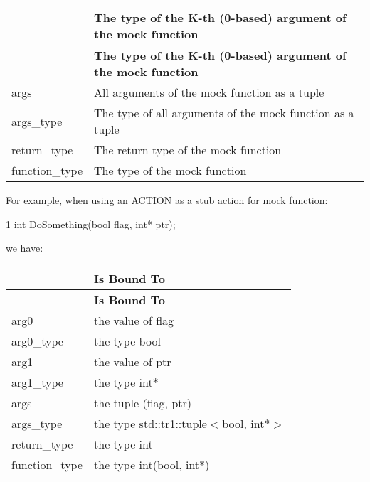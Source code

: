 \tabulinesep=1mm
\begin{longtabu} spread 0pt [c]{*2{|X[-1]}|}
\hline
{}&{\bf The type of the K-\/th (0-\/based) argument of the mock function  }\\
\endfirsthead
\hline
\endfoot
\hline
{}&{\bf The type of the K-\/th (0-\/based) argument of the mock function  }\\
\endhead
{\ttfamily args} &All arguments of the mock function as a tuple \\
{\ttfamily args\+\_\+type} &The type of all arguments of the mock function as a tuple \\
{\ttfamily return\+\_\+type} &The return type of the mock function \\
{\ttfamily function\+\_\+type} &The type of the mock function \\
\end{longtabu}
For example, when using an {\ttfamily A\+C\+T\+I\+ON} as a stub action for mock function\+: 
\begin{DoxyCode}
1 int DoSomething(bool flag, int* ptr);
\end{DoxyCode}
 we have\+: \tabulinesep=1mm
\begin{longtabu} spread 0pt [c]{*2{|X[-1]}|}
\hline
{}&{\bf {\bfseries Is Bound To}  }\\
\endfirsthead
\hline
\endfoot
\hline
{}&{\bf {\bfseries Is Bound To}  }\\
\endhead
{\ttfamily arg0} &the value of {\ttfamily flag} \\
{\ttfamily arg0\+\_\+type} &the type {\ttfamily bool} \\
{\ttfamily arg1} &the value of {\ttfamily ptr} \\
{\ttfamily arg1\+\_\+type} &the type {\ttfamily int$\ast$} \\
{\ttfamily args} &the tuple {\ttfamily (flag, ptr)} \\
{\ttfamily args\+\_\+type} &the type {\ttfamily \hyperlink{classstd_1_1tr1_1_1tuple}{std\+::tr1\+::tuple}$<$bool, int$\ast$$>$} \\
{\ttfamily return\+\_\+type} &the type {\ttfamily int} \\
{\ttfamily function\+\_\+type} &the type {\ttfamily int(bool, int$\ast$)} \\
\end{longtabu}
